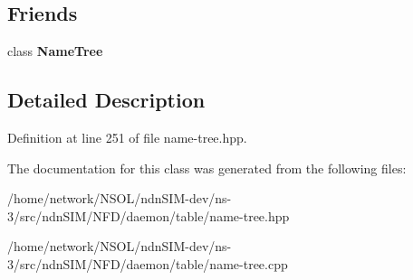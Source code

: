 \subsection*{Friends}
\begin{DoxyCompactItemize}
\item 
class {\bfseries Name\+Tree}\hypertarget{classnfd_1_1NameTree_1_1const__iterator_a29a0e4617dfeaccbd8b789be09a92c40}{}\label{classnfd_1_1NameTree_1_1const__iterator_a29a0e4617dfeaccbd8b789be09a92c40}

\end{DoxyCompactItemize}


\subsection{Detailed Description}


Definition at line 251 of file name-\/tree.\+hpp.



The documentation for this class was generated from the following files\+:\begin{DoxyCompactItemize}
\item 
/home/network/\+N\+S\+O\+L/ndn\+S\+I\+M-\/dev/ns-\/3/src/ndn\+S\+I\+M/\+N\+F\+D/daemon/table/name-\/tree.\+hpp\item 
/home/network/\+N\+S\+O\+L/ndn\+S\+I\+M-\/dev/ns-\/3/src/ndn\+S\+I\+M/\+N\+F\+D/daemon/table/name-\/tree.\+cpp\end{DoxyCompactItemize}
